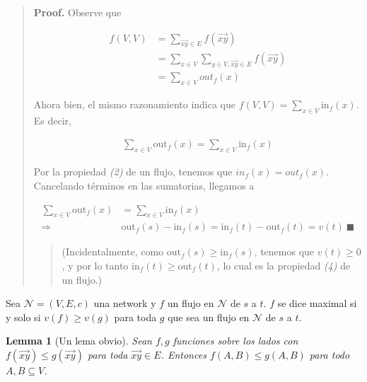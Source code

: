 \documentclass[a4paper]{article}
\newtheorem{lemma}{Lemma}
\newtheorem{lemma}{Lemma}
\begin{document}
\small
\begin{quote}

    \textbf{Proof.} Observe que 

    \begin{align*}
        f(V, V) &= \sum_{\overrightarrow{xy} \in E} f(\overrightarrow{xy}) \\ 
                &= \sum_{x \in V} \sum_{y \in V, \overrightarrow{xy} \in E} f(\overrightarrow{xy}) \\ 
                &= \sum_{x \in V} out_f(x)
    \end{align*}

    Ahora bien, el mismo razonamiento indica que $f(V, V) = \sum_{x \in V}
    \text{in}_f(x)$. Es decir, 

    \begin{align*}
        \sum_{x \in V} \text{out}_f(x) = \sum_{x \in V} \text{in}_f(x)
    \end{align*}

    Por la propiedad \textit{(2)} de un flujo, tenemos que $in_f(x) = out_f(x)$.
    Cancelando términos en las sumatorias, llegamos a 

    \begin{align*}
        \sum_{x \in V} \text{out}_f(x) &= \sum_{x \in V} \text{in}_f(x) \\ 
        \Rightarrow ~& \text{out}_f(s) - \text{in}_f(s) = \text{in}_f(t) -
        \text{out}_f(t) = v(t) ~ \blacksquare
    \end{align*}
    
    \begin{quote}
        (Incidentalmente, como $\text{out}_f(s) \geq \text{in}_f(s)$, tenemos que
        $v(t) \geq 0$, y por lo tanto $\text{in}_f(t) \geq \text{out}_f(t)$, lo
        cual es la propiedad \textit{(4)} de un flujo.)
    \end{quote}

\end{quote}
\normalsize

\begin{definition}
    Sea $\mathcal{N} = (V, E, c)$ una network y $f$ un flujo en $\mathcal{N}$ de
    $s$ a $t$.
    $f$ se dice maximal si y solo si $v(f) \geq v(g)$ para toda $g$ que sea un
    flujo en $\mathcal{N}$ de $s$ a $t$.
\end{definition}


\begin{lemma}[Un lema obvio]
    Sean $f, g$ funciones sobre los lados con $f(\overrightarrow{xy}) \leq g(\overrightarrow{xy})$
    para toda $\overrightarrow{xy} \in E$. Entonces $f(A, B) \leq g(A, B)$ para todo $A, B
    \subseteq V$.
\end{lemma}
\end{document}
